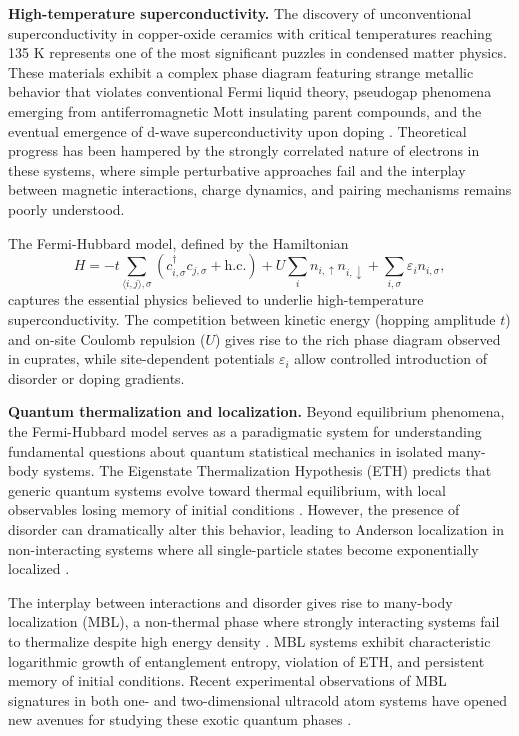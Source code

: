 
\textbf{High-temperature superconductivity.} The discovery of unconventional superconductivity in copper-oxide ceramics with critical temperatures reaching 135 K represents one of the most significant puzzles in condensed matter physics. These materials exhibit a complex phase diagram featuring strange metallic behavior that violates conventional Fermi liquid theory, pseudogap phenomena emerging from antiferromagnetic Mott insulating parent compounds, and the eventual emergence of d-wave superconductivity upon doping \cite{koepsell_quantum_2021}. Theoretical progress has been hampered by the strongly correlated nature of electrons in these systems, where simple perturbative approaches fail and the interplay between magnetic interactions, charge dynamics, and pairing mechanisms remains poorly understood.

The Fermi-Hubbard model, defined by the Hamiltonian
\begin{equation}
H = -t \sum_{\langle i,j \rangle, \sigma} \left( c_{i,\sigma}^\dagger c_{j,\sigma} + \text{h.c.} \right) + U \sum_i n_{i,\uparrow} n_{i,\downarrow} + \sum_{i,\sigma} \varepsilon_i n_{i,\sigma},
\end{equation}
captures the essential physics believed to underlie high-temperature superconductivity. The competition between kinetic energy (hopping amplitude $t$) and on-site Coulomb repulsion ($U$) gives rise to the rich phase diagram observed in cuprates, while site-dependent potentials $\varepsilon_i$ allow controlled introduction of disorder or doping gradients.

\textbf{Quantum thermalization and localization.} Beyond equilibrium phenomena, the Fermi-Hubbard model serves as a paradigmatic system for understanding fundamental questions about quantum statistical mechanics in isolated many-body systems. The Eigenstate Thermalization Hypothesis (ETH) predicts that generic quantum systems evolve toward thermal equilibrium, with local observables losing memory of initial conditions \cite{deutsch_quantum_1991,srednicki_chaos_1994}. However, the presence of disorder can dramatically alter this behavior, leading to Anderson localization in non-interacting systems where all single-particle states become exponentially localized \cite{anderson_absence_1958,billy_direct_2008,roati_anderson_2008}.

The interplay between interactions and disorder gives rise to many-body localization (MBL), a non-thermal phase where strongly interacting systems fail to thermalize despite high energy density \cite{basko_metalinsulator_2006,nandkishore_many-body_2015,abanin_colloquium_2019}. MBL systems exhibit characteristic logarithmic growth of entanglement entropy, violation of ETH, and persistent memory of initial conditions. Recent experimental observations of MBL signatures in both one- and two-dimensional ultracold atom systems have opened new avenues for studying these exotic quantum phases \cite{schreiber_observation_2015,choi_exploring_2016,bordia_probing_2017}.

